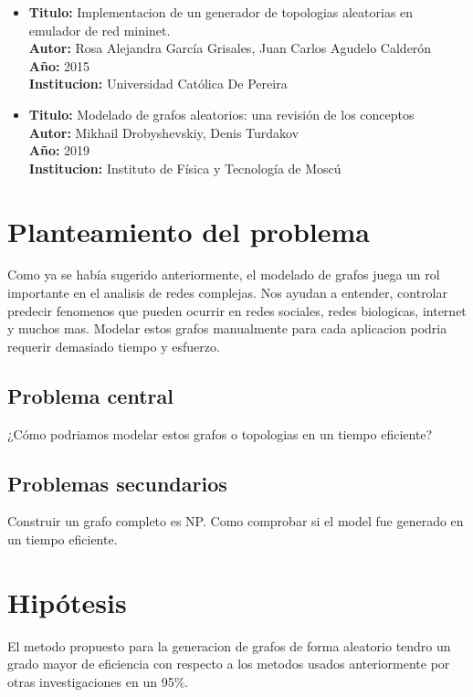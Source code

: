 \documentclass[11pt]{extarticle}
\begin{document}
\begin{itemize}
  \item \textbf{Titulo:} Implementacion de un generador de topologias aleatorias en emulador de red mininet.\\
  \textbf{Autor:} Rosa Alejandra García Grisales, Juan Carlos Agudelo Calderón\\
  \textbf{A\~no:} 2015\\
  \textbf{Institucion:} Universidad Católica De Pereira\\
\end{itemize}

\begin{itemize}
  \item \textbf{Titulo:} Modelado de grafos aleatorios: una revisión de los conceptos\\
  \textbf{Autor:} Mikhail Drobyshevskiy, Denis Turdakov\\
  \textbf{A\~no:} 2019\\
  \textbf{Institucion:} Instituto de Física y Tecnología de Moscú\\
\end{itemize}



\section{Planteamiento del problema}
  Como ya se hab\'ia sugerido anteriormente, el modelado de grafos juega un rol 
  importante en el analisis de redes complejas. Nos ayudan a entender, controlar
  predecir fenomenos que pueden ocurrir en redes sociales, redes biologicas, internet
  y muchos mas. Modelar estos grafos manualmente para cada aplicacion podria requerir
  demasiado tiempo y esfuerzo.
  \subsection{Problema central}
    ¿C\'omo podriamos modelar estos grafos o topologias en un tiempo eficiente?
  \subsection{Problemas secundarios}
    \begin{itemize}
      \guion Construir un grafo completo es NP. 
      \guion Como comprobar si el model fue generado en un tiempo eficiente.
    \end{itemize}
\section{Hip\'otesis}
  El metodo propuesto para la generacion de grafos de forma aleatorio 
  tendro un grado mayor de eficiencia con respecto a los metodos
  usados anteriormente por otras investigaciones en un 95\%.
\end{document}
